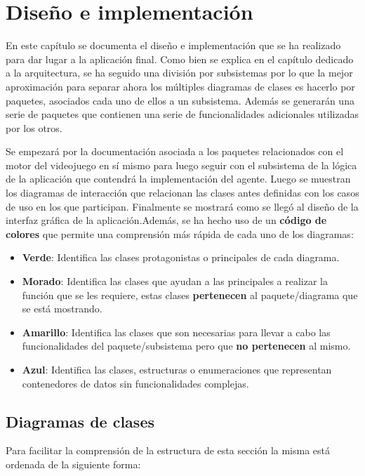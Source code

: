 \chapter{Diseño e implementación}
\label{cap:diseno}
En este capítulo se documenta el diseño e implementación que se ha realizado para dar lugar a la aplicación final. Como bien se explica en el capítulo dedicado a la arquitectura, se ha seguido una división por subsistemas por lo que la mejor aproximación para separar ahora los múltiples diagramas de clases es hacerlo por paquetes, asociados cada uno de ellos a un subsistema. Además se generarán una serie de paquetes que contienen una serie de funcionalidades adicionales utilizadas por los otros.

\bigskip

Se empezará por la documentación asociada a los paquetes relacionados con el motor del videojuego en sí mismo para luego seguir con el subsistema de la lógica de la aplicación que contendrá la implementación del agente. Luego se muestran los diagramas de interacción que relacionan las clases antes definidas con los casos de uso en los que participan. Finalmente se mostrará como se llegó al diseño de la interfaz gráfica de la aplicación.Además, se ha hecho uso de un \textbf{código de colores} que permite una comprensión más rápida de cada uno de los diagramas:

\begin{itemize}
	\item \textbf{Verde}: Identifica las clases protagonistas o principales de cada diagrama.
	\item \textbf{Morado}: Identifica las clases que ayudan a las principales a realizar la función que se les requiere, estas clases \textbf{pertenecen} al paquete/diagrama que se está mostrando.
	\item \textbf{Amarillo}: Identifica las clases que son necesarias para llevar a cabo las funcionalidades del paquete/subsistema pero que \textbf{no pertenecen} al mismo.
	\item \textbf{Azul}: Identifica las clases, estructuras o enumeraciones que representan contenedores de datos sin funcionalidades complejas.
\end{itemize}

\section{Diagramas de clases}

Para facilitar la comprensión de la estructura de esta sección la misma está ordenada de la siguiente forma:

